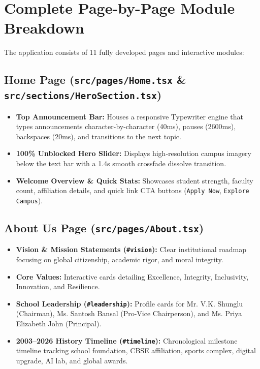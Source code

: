 \documentclass[11pt,a4paper]{article}
\begin{document}
\newpage

\section{Complete Page-by-Page Module Breakdown}

The application consists of 11 fully developed pages and interactive modules:

\subsection{Home Page (\texttt{src/pages/Home.tsx} \& \texttt{src/sections/HeroSection.tsx})}
\begin{itemize}
    \item \textbf{Top Announcement Bar:} Houses a responsive Typewriter engine that types announcements character-by-character (40ms), pauses (2600ms), backspaces (20ms), and transitions to the next topic.
    \item \textbf{100\% Unblocked Hero Slider:} Displays high-resolution campus imagery below the text bar with a 1.4s smooth crossfade dissolve transition.
    \item \textbf{Welcome Overview \& Quick Stats:} Showcases student strength, faculty count, affiliation details, and quick link CTA buttons (\texttt{Apply Now}, \texttt{Explore Campus}).
\end{itemize}

\subsection{About Us Page (\texttt{src/pages/About.tsx})}
\begin{itemize}
    \item \textbf{Vision \& Mission Statements (\texttt{\#vision}):} Clear institutional roadmap focusing on global citizenship, academic rigor, and moral integrity.
    \item \textbf{Core Values:} Interactive cards detailing Excellence, Integrity, Inclusivity, Innovation, and Resilience.
    \item \textbf{School Leadership (\texttt{\#leadership}):} Profile cards for Mr. V.K. Shunglu (Chairman), Ms. Santosh Bansal (Pro-Vice Chairperson), and Ms. Priya Elizabeth John (Principal).
    \item \textbf{2003--2026 History Timeline (\texttt{\#timeline}):} Chronological milestone timeline tracking school foundation, CBSE affiliation, sports complex, digital upgrade, AI lab, and global awards.
\end{itemize}
\end{document}
